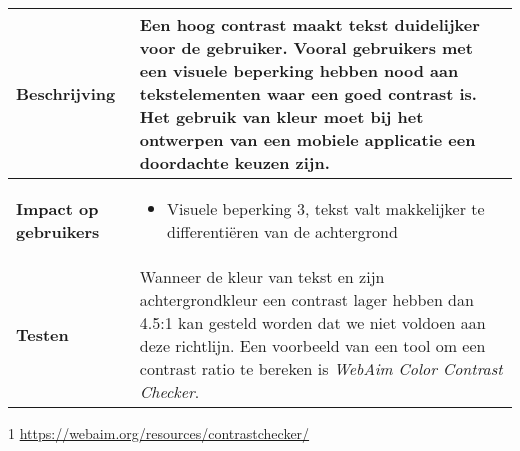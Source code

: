 \begin{table}[H]
\begin{threeparttable}
\begin{tabular}{|l|p{12cm}|}
        \textbf{Beschrijving}                 & Een hoog contrast maakt tekst duidelijker voor de gebruiker. Vooral gebruikers met een visuele beperking hebben nood aan tekstelementen waar een goed contrast is. Het gebruik van kleur moet bij het ontwerpen van een mobiele applicatie een doordachte keuzen zijn. \\ 
        \hline
        \textbf{Impact op gebruikers}         &  
        \begin{itemize}
            \item Visuele beperking 3, tekst valt makkelijker te differentiëren van de achtergrond
        \end{itemize}                                                                                                                                                                                                                                                                                                                                                                                                                    \\ 
        \hline
        \textbf{Testen}                       & Wanneer de kleur van tekst en zijn achtergrondkleur een contrast lager hebben dan 4.5:1 kan gesteld worden dat we niet voldoen aan deze richtlijn. Een voorbeeld van een tool om een contrast ratio te bereken is  \emph{WebAim Color Contrast Checker}\tnote{1}.                                                                                                                                                                                                                                 \\
        \hline
    \end{tabular}
\begin{tablenotes}
    \item[1] \url{https://webaim.org/resources/contrastchecker/}
    
\end{tablenotes}
   \end{threeparttable}
\end{table}


